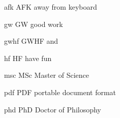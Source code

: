\newabbreviation
{afk}
{AFK}
{away from keyboard}

\newabbreviation
{gw}
{GW}
{good work}

\newabbreviation
{gwhf}
{GWHF}
{ and }

\newabbreviation
{hf}
{HF}
{have fun}

\newabbreviation
{msc}
{MSc}
{Master of Science}

\newabbreviation
{pdf}
{PDF}
{portable document format}

\newabbreviation
{phd}
{PhD}
{Doctor of Philosophy}

